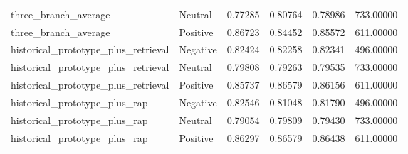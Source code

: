 \begin{tabular}{llrrrr}
three_branch_average & Neutral & 0.77285 & 0.80764 & 0.78986 & 733.00000 \\
three_branch_average & Positive & 0.86723 & 0.84452 & 0.85572 & 611.00000 \\
historical_prototype_plus_retrieval & Negative & 0.82424 & 0.82258 & 0.82341 & 496.00000 \\
historical_prototype_plus_retrieval & Neutral & 0.79808 & 0.79263 & 0.79535 & 733.00000 \\
historical_prototype_plus_retrieval & Positive & 0.85737 & 0.86579 & 0.86156 & 611.00000 \\
historical_prototype_plus_rap & Negative & 0.82546 & 0.81048 & 0.81790 & 496.00000 \\
historical_prototype_plus_rap & Neutral & 0.79054 & 0.79809 & 0.79430 & 733.00000 \\
historical_prototype_plus_rap & Positive & 0.86297 & 0.86579 & 0.86438 & 611.00000 \\
\bottomrule
\end{tabular}
